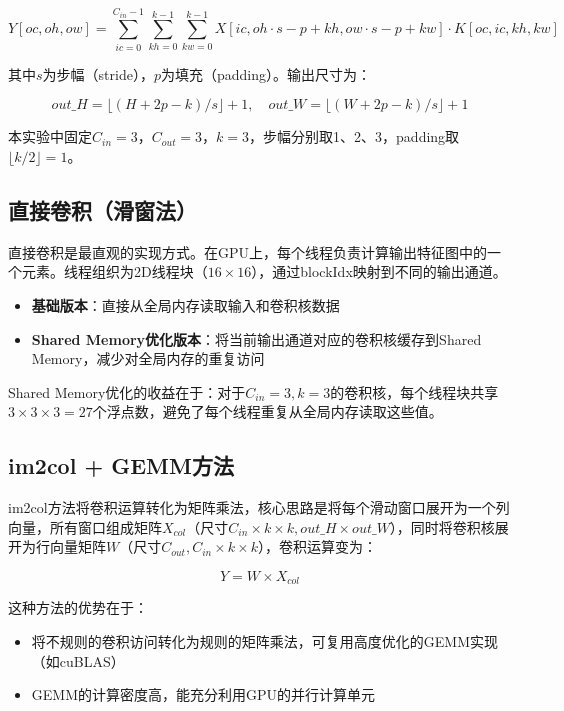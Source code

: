 \documentclass[a4paper]{article}
\begin{document}
\begin{equation}
Y[oc, oh, ow] = \sum_{ic=0}^{C_{in}-1}\sum_{kh=0}^{k-1}\sum_{kw=0}^{k-1} X[ic, oh\cdot s - p + kh, ow\cdot s - p + kw] \cdot K[oc, ic, kh, kw]
\end{equation}

其中$s$为步幅（stride），$p$为填充（padding）。输出尺寸为：

\begin{equation}
out\_H = \lfloor(H + 2p - k) / s\rfloor + 1, \quad out\_W = \lfloor(W + 2p - k) / s\rfloor + 1
\end{equation}

本实验中固定$C_{in} = 3$，$C_{out} = 3$，$k = 3$，步幅分别取1、2、3，padding取$\lfloor k/2 \rfloor = 1$。

\subsection{直接卷积（滑窗法）}

直接卷积是最直观的实现方式。在GPU上，每个线程负责计算输出特征图中的一个元素。线程组织为2D线程块（$16\times 16$），通过blockIdx映射到不同的输出通道。

\begin{itemize}
    \item \textbf{基础版本}：直接从全局内存读取输入和卷积核数据
    \item \textbf{Shared Memory优化版本}：将当前输出通道对应的卷积核缓存到Shared Memory，减少对全局内存的重复访问
\end{itemize}

Shared Memory优化的收益在于：对于$C_{in}=3, k=3$的卷积核，每个线程块共享$3\times 3\times 3 = 27$个浮点数，避免了每个线程重复从全局内存读取这些值。

\subsection{im2col + GEMM方法}

im2col方法将卷积运算转化为矩阵乘法\cite{chellapilla2006high}，核心思路是将每个滑动窗口展开为一个列向量，所有窗口组成矩阵$X_{col}$（尺寸$C_{in}\times k\times k, out\_H\times out\_W$），同时将卷积核展开为行向量矩阵$W$（尺寸$C_{out}, C_{in}\times k\times k$），卷积运算变为：

\begin{equation}
Y = W \times X_{col}
\end{equation}

这种方法的优势在于：
\begin{itemize}
    \item 将不规则的卷积访问转化为规则的矩阵乘法，可复用高度优化的GEMM实现（如cuBLAS）
    \item GEMM的计算密度高，能充分利用GPU的并行计算单元
\end{itemize}
\end{document}
